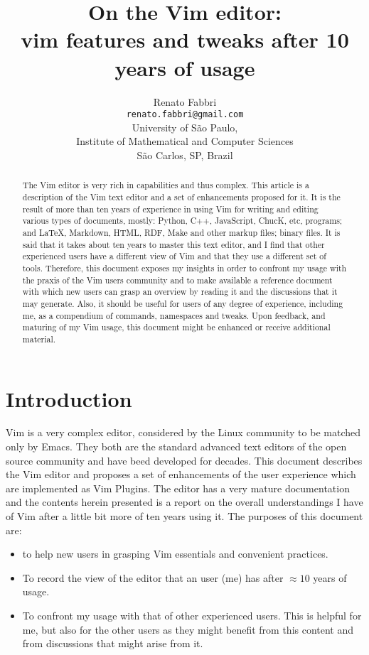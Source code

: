 \documentclass{article}
\begin{document}
\title{On the Vim editor:\\
vim features and tweaks after 10 years of usage}

\author{Renato Fabbri\\
\texttt{renato.fabbri@gmail.com}\\
University of São Paulo,\\
Institute of Mathematical and Computer Sciences\\
São Carlos, SP, Brazil
}
\maketitle
\begin{abstract}
The Vim editor is very rich in capabilities
and thus complex.
This article is a description of the Vim text editor
and a set of enhancements proposed for it.
It is the result of more than ten years of experience
in using Vim for writing and editing various types of documents,
mostly:
Python, C++, JavaScript, ChucK, etc, programs;
and \LaTeX, Markdown, HTML, RDF, Make and other markup files;
binary files.
It is said that it takes about ten years to master this
text editor, and I find that other experienced users
have a different view of Vim and that they use a different
set of tools.
Therefore, this document exposes my insights in order
to confront my usage with the praxis of the Vim users community
and to make available a reference document with which new users
can grasp an overview by reading it and the discussions that it may generate.
Also, it should be useful for users of any degree of experience,
including me, as a compendium of commands, namespaces and tweaks.
Upon feedback, and maturing of my Vim usage,
this document might be enhanced or receive additional
material.
\end{abstract}

\section{Introduction}
Vim is a very complex editor,
considered by the Linux community to be
matched only by Emacs.
They both are the standard advanced text editors
of the open source community
and have beed developed for decades.
This document describes the Vim editor
and proposes a set of enhancements of the user
experience which
are implemented as Vim Plugins.
The editor has a very mature documentation
and the contents herein presented is a
report on the overall understandings I
have of Vim after a little bit more
of ten years using it.
The purposes of this document are:
\begin{itemize}
  \item to help new users in grasping Vim essentials
  and convenient practices.
  \item To record the view of the editor that
  an user (me) has after $\approx 10$ years of usage.
  \item To confront my usage with that of other experienced
  users. This is helpful for me, but also for the other users
  as they might benefit from this content and from discussions
  that might arise from it.
\end{itemize}
\end{document}
